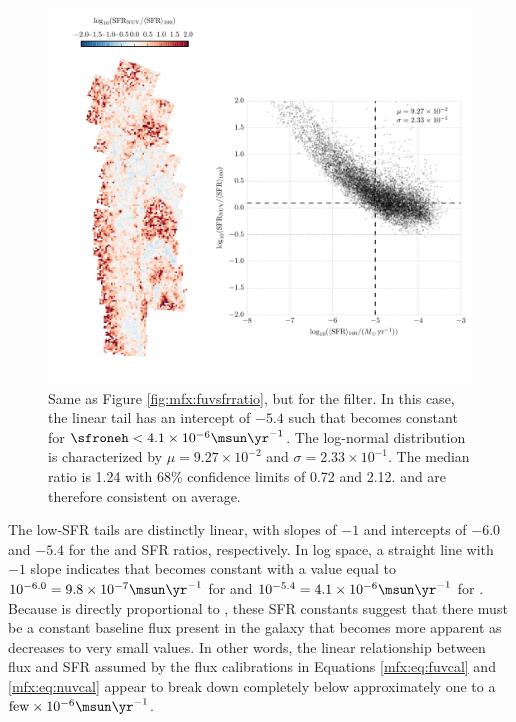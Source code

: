 \begin{figure}
\centering
\includegraphics[width=\textwidth]{m31flux-figures/sfr_nuv-vs-mean.pdf}
\caption[Ratio of the \sfr{} based on the observed extinction-corrected \nuv{}
flux to the $100\myr$ mean \sfr{}.]{Same as Figure \ref{fig:mfx:fuvsfrratio},
    but for the \nuv{} filter. In this case, the linear tail has an intercept
    of $-5.4$ such that \sfrnuv{} becomes constant for $\sfroneh < 4.1\times
    10^{-6}\msun\yr^{-1}$. The log-normal distribution is characterized by $\mu
    = 9.27\times 10^{-2}$ and $\sigma = 2.33\times 10^{-1}$. The median ratio
    is 1.24 with 68\% confidence limits of 0.72 and 2.12. \sfrnuv{} and
    \sfroneh{} are therefore consistent on average.
}
\label{fig:mfx:nuvsfrratio}
\end{figure}


The low-SFR tails are distinctly linear, with slopes of $-1$ and intercepts of
$-6.0$ and $-5.4$ for the \fuv{} and \nuv{} SFR ratios, respectively. In log
space, a straight line with $-1$ slope indicates that \sfrx{} becomes constant
with a value equal to $10^{-6.0} = 9.8\times 10^{-7}\msun\yr^{-1}$ for \fuv{}
and $10^{-5.4} = 4.1\times 10^{-6}\msun\yr^{-1}$ for \nuv{}. Because \sfrx{} is
directly proportional to \fxobs{}, these SFR constants suggest that there must
be a constant baseline flux present in the galaxy that becomes more apparent as
\sfroneh{} decreases to very small values. In other words, the linear
relationship between flux and SFR assumed by the flux calibrations in Equations
\ref{mfx:eq:fuvcal} and \ref{mfx:eq:nuvcal} appear to break down completely
below \sfroneh{} approximately one to a $\mathrm{few} \times
10^{-6}\msun\yr^{-1}$.

